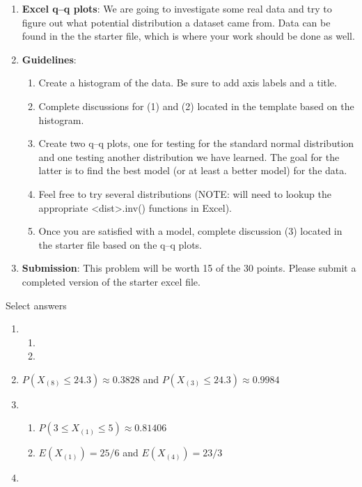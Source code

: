 \documentclass{article}
\newcommand{\order}[2]{#1_{(#2)}}		%
\begin{document}
\begin{enumerate}
    \item \textbf{Excel q--q plots}: We are going to investigate some real data and try to figure out what potential distribution a dataset came from. Data can be found in the the starter file, which is where your work should be done as well.
    \item[] \textbf{Guidelines}: 
    \begin{enumerate}
        \item Create a histogram of the data. Be sure to add axis labels and a title.
        \item Complete discussions for (1) and (2) located in the template based on the histogram.
        \item Create two q--q plots, one for testing for the standard normal distribution and one testing another distribution we have learned. The goal for the latter is to find the best model (or at least a better model) for the data.
        \item[] Feel free to try several distributions (NOTE: will need to lookup the appropriate <dist>.inv() functions in Excel).
        \item Once you are satisfied with a model, complete discussion (3) located in the starter file based on the q--q plots.
    \end{enumerate}
    \item[] \textbf{Submission}: This problem will be worth 15 of the 30 points. Please submit a completed version of the starter excel file.
\end{enumerate}

\newpage

Select answers\bigskip
\begin{enumerate}
    \item 
    \begin{enumerate}
        \item 
        \item 
    \end{enumerate}
    
    \item $P(\order{X}{8} \le 24.3) \approx 0.3828$ and $P(\order{X}{3} \le 24.3) \approx 0.9984$
    
    \item 
    \begin{enumerate}
        \item $P(3 \le \order{X}{1} \le 5) \approx 0.81406$
        \item $E(\order{X}{1}) = 25/6$ and $E(\order{X}{4}) = 23/3$
    \end{enumerate}
    
    \item
                
\end{enumerate}
\end{document}
